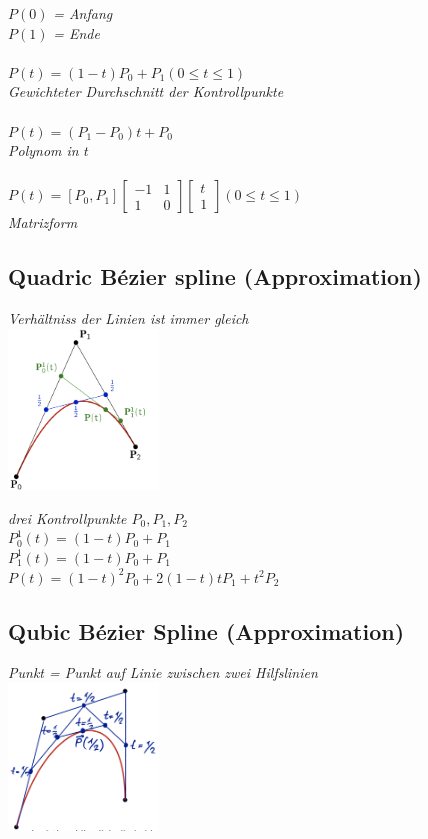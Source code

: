 $P(0)$ \textit{= Anfang}\\
$P(1)$ \textit{= Ende}\\
\\
$P(t) = (1 - t) P_0 + P_1 (0 \leq t \leq 1)$ \\
\textit{Gewichteter Durchschnitt der Kontrollpunkte} \\
\\
$P(t) = (P_1 - P_0) t + P_0$ \\
\textit{Polynom in $t$} \\
\\
$P(t) = [P_0, P_1] \begin{bmatrix}
    -1 & 1 \\ 1 & 0
\end{bmatrix}
\begin{bmatrix}
    t \\ 1
\end{bmatrix} (0 \leq t \leq 1)$ \\
\textit{Matrizform}

\subsection{Quadric Bézier spline (Approximation)}
\textit{Verhältniss der Linien ist immer gleich}\\
\includegraphics[width=0.3\textwidth]{assets/quadratischeBesierSpline.png}

\textit{drei Kontrollpunkte $P_0, P_1, P_2$}\\

$P_0^1(t) = (1-t)P_0 + P_1$ \\
$P_1^1(t) = (1-t)P_0 + P_1$ \\

$P(t) = (1 - t)^2P_0 + 2(1 - t)tP_1 + t^2 P_2$

\subsection{Qubic Bézier Spline (Approximation)}
\textit{Punkt = Punkt auf Linie zwischen zwei Hilfslinien}\\
\includegraphics[width=0.3\textwidth]{assets/qubicBesierSpline.png}

